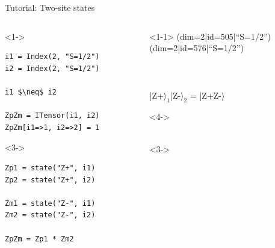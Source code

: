 \begin{frame}[fragile]{Tutorial: Two-site states}

\begin{columns}

\begin{column}{4.5cm}

\begin{onlyenv}<1->
\begin{lstlisting}[language=JuliaLocal, style=julia, mathescape, basicstyle=\small]
i1 = Index(2, "S=1/2")
i2 = Index(2, "S=1/2")

i1 $\neq$ i2

ZpZm = ITensor(i1, i2)
ZpZm[i1=>1, i2=>2] = 1
\end{lstlisting}
\end{onlyenv}

\begin{onlyenv}<3->
\begin{lstlisting}[language=JuliaLocal, style=julia, basicstyle=\small]
Zp1 = state("Z+", i1)
Zp2 = state("Z+", i2)

Zm1 = state("Z-", i1)
Zm2 = state("Z-", i2)

ZpZm = Zp1 * Zm2
\end{lstlisting}
\end{onlyenv}

\end{column}

\begin{column}{5cm}

\begin{onlyenv}<1-1>
(dim=2|id=505|``S=1/2'') \\
(dim=2|id=576|``S=1/2'') \\
~\\
~\\
~\\
|Z+$\rangle_1$|Z-$\rangle_2$ = |Z+Z-$\rangle$ \\
\end{onlyenv}

\begin{onlyenv}<4->
~\\
~\\
\end{onlyenv}

\begin{onlyenv}<3->
~\\
\end{onlyenv}


\end{column}
\end{columns}
\end{frame}
